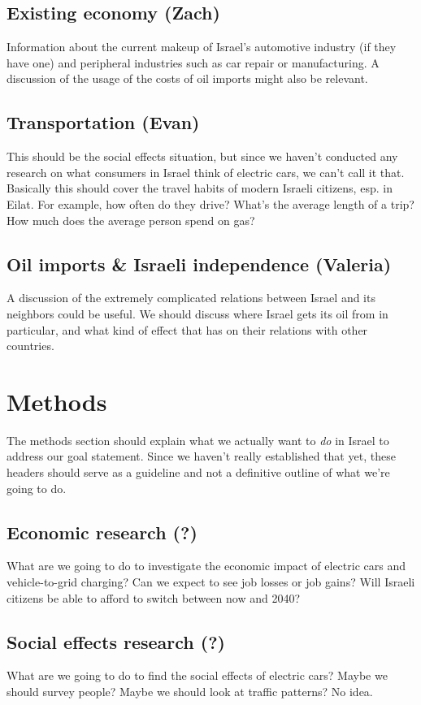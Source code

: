 \documentclass{article}                         %
\begin{document}
\subsection{Existing economy (Zach)}
Information about the current makeup of Israel's automotive industry (if they have one) and peripheral industries such as car repair or manufacturing. A discussion of the usage of the costs of oil imports might also be relevant.

\subsection{Transportation (Evan)}
This should be the social effects situation, but since we haven't conducted any research on what consumers in Israel think of electric cars, we can't call it that. Basically this should cover the travel habits of modern Israeli citizens, esp. in Eilat. For example, how often do they drive? What's the average length of a trip? How much does the average person spend on gas?

\subsection{Oil imports \& Israeli independence (Valeria)}

A discussion of the extremely complicated relations between Israel and its neighbors could be useful. We should discuss where Israel gets its oil from in particular, and what kind of effect that has on their relations with other countries.

\newpage
\section{Methods}
The methods section should explain what we actually want to \textit{do} in Israel to address our goal statement. Since we haven't really established that yet, these headers should serve as a guideline and not a definitive outline of what we're going to do.

\subsection{Economic research (?)}
What are we going to do to investigate the economic impact of electric cars and vehicle-to-grid charging? Can we expect to see job losses or job gains? Will Israeli citizens be able to afford to switch between now and 2040?

\subsection{Social effects research (?)}
What are we going to do to find the social effects of electric cars? Maybe we should survey people? Maybe we should look at traffic patterns? No idea.
\end{document}
